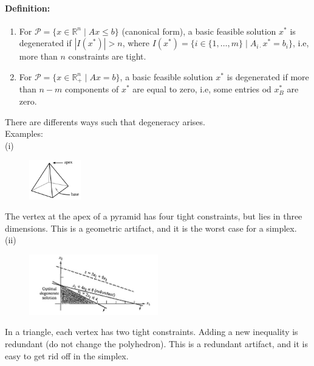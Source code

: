 \documentclass[main]{subfiles}
\begin{document}
\paragraph{Definition:}
\begin{enumerate}
\item For $\mathcal{P} = \{x \in \mathbb{R}^n \mid Ax \leq b\}$ (canonical
form), a basic feasible solution $x^*$ is degenerated if $|I(x^*)| > n$, where
$I(x^*) = \{i \in \{1, \dots, m\} \mid A_{i\cdot}x^* = b_i\}$, i.e, more than
$n$ constraints are tight.
\item For $\mathcal{P} = \{x \in \mathbb{R}^n_+ \mid Ax = b\}$, a basic
feasible solution $x^*$ is degenerated if more than $n-m$ components of $x^*$
are equal to zero, i.e, some entries od $x^*_B$ are zero.
\end{enumerate}

There are differents ways such that degeneracy arises.\\
Examples:\\

(i)\\
\begin{figure}[!h]
  \label{fig:projection}
  \centering
    \includegraphics[width=0.2\textwidth]{imgs/pyramide.png}
\end{figure}

The vertex at the apex of a pyramid has four tight constraints, but lies in 
three dimensions. This is a geometric artifact, and it is the worst case for a
simplex.\\

(ii)\\
\begin{figure}[!h]
  \label{fig:projection}
  \centering
    \includegraphics[width=0.5\textwidth]{imgs/triangle-degeneracy.png}
\end{figure}

In a triangle, each vertex has two tight constraints. Adding a new inequality
is redundant (do not change the polyhedron). This is a redundant artifact, and
it is easy to get rid off in the simplex.\\
\end{document}
